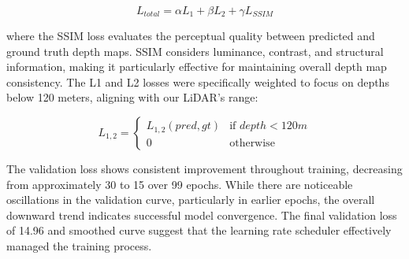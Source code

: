 \[
L_{total} = \alpha L_1 + \beta L_2 + \gamma L_{SSIM}
\]


where the \ac{SSIM} loss evaluates the perceptual quality between predicted and ground truth depth maps. SSIM considers luminance, contrast, and structural information, making it particularly effective for maintaining overall depth map consistency. The L1 and L2 losses were specifically weighted to focus on depths below 120 meters, aligning with our \ac{LiDAR}'s range:

\[
    L_{1,2} = \begin{cases}
    L_{1,2}(pred, gt) & \text{if } depth < 120m \\
    0 & \text{otherwise}
    \end{cases}
\]

The validation loss shows consistent improvement throughout training, decreasing from approximately 30 to 15 over 99 epochs. While there are noticeable oscillations in the validation curve, particularly in earlier epochs, the overall downward trend indicates successful model convergence. The final validation loss of 14.96 and smoothed curve suggest that the learning rate scheduler effectively managed the training process.


